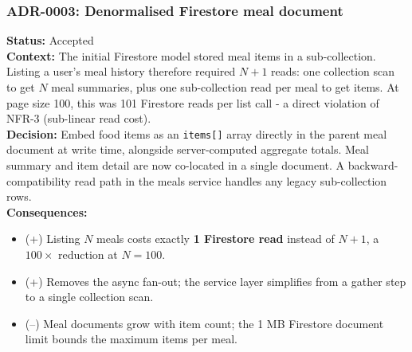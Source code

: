 \documentclass[11pt]{article}
\begin{document}
\subsubsection{ADR-0003: Denormalised Firestore meal document}
\textbf{Status:} Accepted \\
\textbf{Context:} The initial Firestore model stored meal items in a sub-collection. Listing a user's meal history
therefore required $N{+}1$ reads: one collection scan to get $N$ meal summaries, plus one
sub-collection read per meal to get items. At page size 100, this was 101 Firestore reads per
list call - a direct violation of NFR-3 (sub-linear read cost). \\
\textbf{Decision:} Embed food items as an \texttt{items[]} array directly in the parent meal
document at write time, alongside server-computed aggregate totals. Meal summary and item detail
are now co-located in a single document. A backward-compatibility read path in the meals
service handles any legacy sub-collection rows. \\
\textbf{Consequences:}
\begin{itemize}[leftmargin=1.2em]
  \item (+) Listing $N$ meals costs exactly \textbf{1 Firestore read} instead of $N{+}1$, a $100\times$ reduction at $N{=}100$.
  \item (+) Removes the async fan-out; the service layer simplifies from a gather step to a single collection scan.
  \item (--) Meal documents grow with item count; the 1 MB Firestore document limit bounds the maximum items per meal.
\end{itemize}
\end{document}
